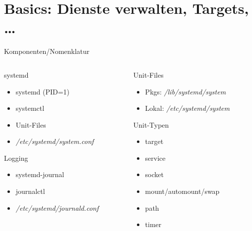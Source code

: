 \section[Basics]{Basics: Dienste verwalten, Targets, \dots}

\begin{frame}{Komponenten/Nomenklatur}
  \begin{columns}[onlytextwidth]
    \begin{column}{0.5\textwidth}
      \begin{block}{systemd}
        \begin{itemize}
          \item systemd (PID=1)
          \item systemctl
          \item Unit-Files
	  \item \emph{/etc/systemd/system.conf}
 	\end{itemize}
      \end{block}

      \begin{block}{Logging}
        \begin{itemize}
          \item systemd-journal
          \item journalctl
	  \item \emph{/etc/systemd/journald.conf}
        \end{itemize}
      \end{block}
    \end{column}

    \begin{column}{0.5\textwidth}
      \begin{block}{Unit-Files}
        \begin{itemize}
	  \item Pkgs: \emph{/lib/systemd/system}
	  \item Lokal: \emph{/etc/systemd/system}
	\end{itemize}
      \end{block}

      \begin{block}{Unit-Typen}
        \begin{itemize}
	  \item target
	  \item service
	  \item socket
	  \item mount/automount/swap
	  \item path
	  \item timer
	\end{itemize}
      \end{block}
    \end{column}
  \end{columns}
\end{frame}

